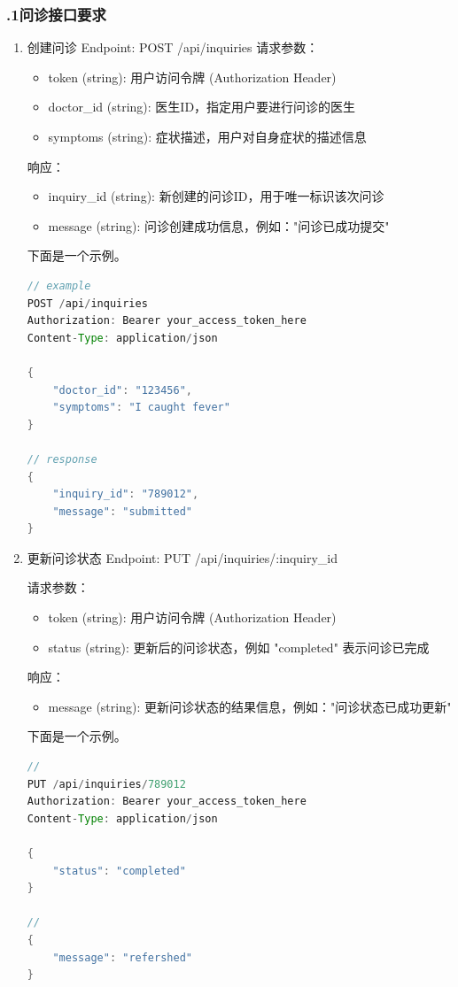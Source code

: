 \documentclass[24pt,a4paper]{article}%
\begin{document}
\subsubsection*{.1问诊接口要求}
\begin{enumerate}
	\item 创建问诊
	Endpoint: POST /api/inquiries
	请求参数：
	\begin{itemize}
		\item token (string): 用户访问令牌 (Authorization Header)
		\item doctor\_id (string): 医生ID，指定用户要进行问诊的医生
		\item symptoms (string): 症状描述，用户对自身症状的描述信息
	\end{itemize}
	响应：
	\begin{itemize}
		\item inquiry\_id (string): 新创建的问诊ID，用于唯一标识该次问诊
		\item message (string): 问诊创建成功信息，例如："问诊已成功提交"
	\end{itemize}
	下面是一个示例。
	\begin{lstlisting}[language=java]
// example
POST /api/inquiries
Authorization: Bearer your_access_token_here
Content-Type: application/json

{
	"doctor_id": "123456",
	"symptoms": "I caught fever"
}

// response
{
	"inquiry_id": "789012",
	"message": "submitted"
}
	\end{lstlisting}
	\item 更新问诊状态
	Endpoint: PUT /api/inquiries/:inquiry\_id
	
	请求参数：
	\begin{itemize}
		\item token (string): 用户访问令牌 (Authorization Header)
		\item status (string): 更新后的问诊状态，例如 "completed" 表示问诊已完成
	\end{itemize}
	响应：
	\begin{itemize}
		\item message (string): 更新问诊状态的结果信息，例如："问诊状态已成功更新"
	\end{itemize}
	下面是一个示例。
	\begin{lstlisting}[language=java]
// 
PUT /api/inquiries/789012
Authorization: Bearer your_access_token_here
Content-Type: application/json

{
	"status": "completed"
}

// 
{
	"message": "refershed"
}

	\end{lstlisting}
\end{enumerate}
\end{document}
